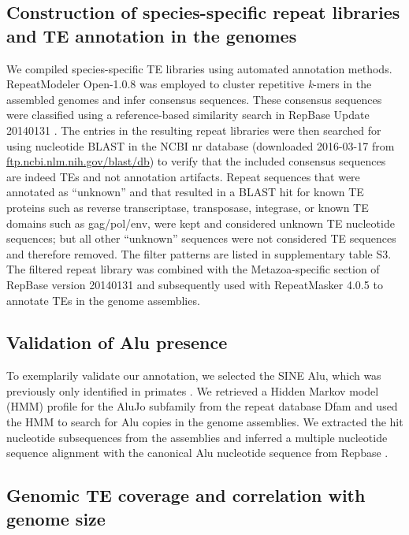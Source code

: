\subsection{Construction of species-specific repeat libraries and TE
annotation in the
genomes}\label{construction-of-species-specific-repeat-libraries-and-te-annotation-in-the-genomes}

We compiled species-specific TE libraries using automated annotation
methods. RepeatModeler Open-1.0.8 \citep{Smit2015} was employed to
cluster repetitive \emph{k}-mers in the assembled genomes and infer
consensus sequences. These consensus sequences were classified using a
reference-based similarity search in RepBase Update 20140131
\citep{Jurka2005}. The entries in the resulting repeat libraries were
then searched for using nucleotide BLAST in the NCBI nr database
(downloaded 2016-03-17 from
\href{ftp://ftp.ncbi.nlm.nih.gov/blast/db}{ftp.ncbi.nlm.nih.gov/blast/db})
to verify that the included consensus sequences are indeed TEs and not
annotation artifacts. Repeat sequences that were annotated as
``unknown'' and that resulted in a BLAST hit for known TE proteins such
as reverse transcriptase, transposase, integrase, or known TE domains
such as gag/pol/env, were kept and considered unknown TE nucleotide
sequences; but all other ``unknown'' sequences were not considered TE
sequences and therefore removed. The filter patterns are listed in
supplementary table S3. The filtered repeat library was combined with
the Metazoa-specific section of RepBase version 20140131 and
subsequently used with RepeatMasker 4.0.5 \citep{Smit2015} to annotate
TEs in the genome assemblies.

\subsection{Validation of Alu
presence}\label{validation-of-alu-presence}

To exemplarily validate our annotation, we selected the SINE Alu, which
was previously only identified in primates \citep{Kriegs2007}. We
retrieved a Hidden Markov model (HMM) profile for the AluJo subfamily
from the repeat database Dfam \citep{Hubley2015} and used the HMM to
search for Alu copies in the genome assemblies. We extracted the hit
nucleotide subsequences from the assemblies and inferred a multiple
nucleotide sequence alignment with the canonical Alu nucleotide sequence
from Repbase \citep{Jurka2005}.

\subsection{Genomic TE coverage and correlation with genome
size}\label{genomic-te-coverage-and-correlation-with-genome-size}

